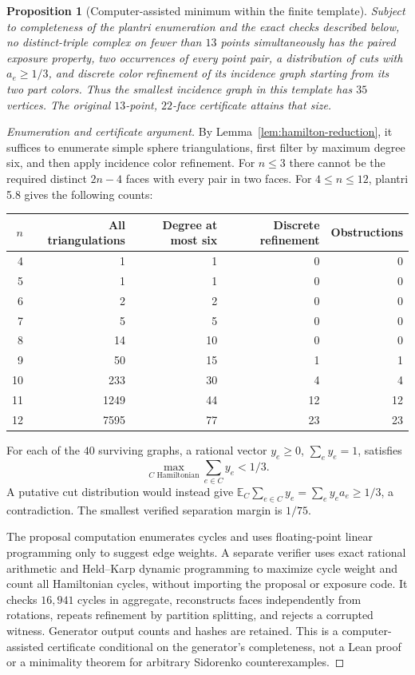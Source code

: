\documentclass[11pt]{article}
\newtheorem{proposition}{Proposition}
\begin{document}
\begin{proposition}[Computer-assisted minimum within the finite template]
Subject to completeness of the plantri enumeration and the exact checks
described below, no distinct-triple complex on fewer than $13$ points
simultaneously has the paired exposure property, two occurrences of every
point pair, a distribution of cuts with $a_e\ge1/3$, and discrete color
refinement of its incidence graph starting from its two part colors.
Thus the smallest incidence graph in this template has $35$ vertices.
The original $13$-point, $22$-face certificate attains that size.
\end{proposition}
\begin{proof}[Enumeration and certificate argument]
By Lemma~\ref{lem:hamilton-reduction}, it suffices to enumerate simple
sphere triangulations, first filter by maximum degree six, and then
apply incidence color refinement. For $n\le3$ there cannot be the
required distinct $2n-4$ faces with every pair in two faces. For
$4\le n\le12$, plantri 5.8 gives the following counts:
\begin{center}\small
\begin{tabular}{@{}rrrrr@{}}
\toprule
$n$&All triangulations&Degree at most six&Discrete refinement&Obstructions\\
\midrule
4&1&1&0&0\\
5&1&1&0&0\\
6&2&2&0&0\\
7&5&5&0&0\\
8&14&10&0&0\\
9&50&15&1&1\\
10&233&30&4&4\\
11&1249&44&12&12\\
12&7595&77&23&23\\
\bottomrule
\end{tabular}
\end{center}
For each of the $40$ surviving graphs, a rational vector $y_e\ge0$,
$\sum_ey_e=1$, satisfies
\[
 \max_{C\text{ Hamiltonian}}\sum_{e\in C}y_e<1/3.
\]
A putative cut distribution would instead give
$\mathbb E_C\sum_{e\in C}y_e=\sum_ey_ea_e\ge1/3$, a contradiction.
The smallest verified separation margin is $1/75$.

The proposal computation enumerates cycles and uses floating-point linear
programming only to suggest edge weights. A separate verifier uses exact
rational arithmetic and Held--Karp dynamic programming to maximize cycle
weight and count all Hamiltonian cycles, without importing the proposal
or exposure code. It checks $16{,}941$ cycles in aggregate, reconstructs
faces independently from rotations, repeats refinement by partition
splitting, and rejects a corrupted witness. Generator output counts and
hashes are retained. This is a computer-assisted certificate conditional
on the generator's completeness, not a Lean proof or a minimality theorem
for arbitrary Sidorenko counterexamples.
\end{proof}
\end{document}
